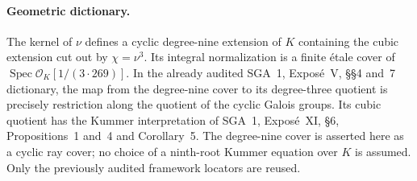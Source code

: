 \paragraph{Geometric dictionary.}
The kernel of $\nu$ defines a cyclic degree-nine extension of
$K$ containing the cubic extension cut out by $\chi=\nu^3$.
Its integral normalization is a finite \'etale cover of
$\operatorname{Spec}\mathcal O_K[1/(3\cdot269)]$.
In the already audited SGA~1, Expos\'e~V, \S\S4 and~7
dictionary, the map from the degree-nine cover to its degree-three
quotient is precisely restriction along the quotient of the
cyclic Galois groups.  Its cubic quotient has the Kummer
interpretation of SGA~1, Expos\'e~XI, \S6,
Propositions~1 and~4 and Corollary~5.
The degree-nine cover is asserted here as a cyclic ray cover;
no choice of a ninth-root Kummer equation over $K$ is assumed.
Only the previously audited framework locators are reused.
